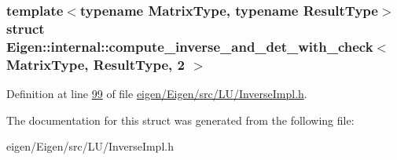 \subsubsection*{template$<$typename Matrix\+Type, typename Result\+Type$>$\newline
struct Eigen\+::internal\+::compute\+\_\+inverse\+\_\+and\+\_\+det\+\_\+with\+\_\+check$<$ Matrix\+Type, Result\+Type, 2 $>$}



Definition at line \hyperlink{eigen_2_eigen_2src_2_l_u_2_inverse_impl_8h_source_l00099}{99} of file \hyperlink{eigen_2_eigen_2src_2_l_u_2_inverse_impl_8h_source}{eigen/\+Eigen/src/\+L\+U/\+Inverse\+Impl.\+h}.



The documentation for this struct was generated from the following file\+:\begin{DoxyCompactItemize}
\item 
eigen/\+Eigen/src/\+L\+U/\+Inverse\+Impl.\+h\end{DoxyCompactItemize}
